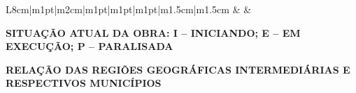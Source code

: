\documentclass{article}
\begin{document}
\begin{longtable}[c]{L{8cm}|m{1pt}|m{2cm}|m{1pt}|m{1pt}|m{1pt}|m{1.5cm}|m{1.5cm}}
\hline \hline 
{} &  &  \\
\end{longtable}
\raggedright{\textbf{SITUAÇÃO ATUAL DA OBRA: I – INICIANDO; E – EM EXECUÇÃO; P – PARALISADA}} 
\newpage
\ifthispageodd{ }{\afterpage{\null\thispagestyle{empty}\newpage}}
\restoregeometry
\vspace*{9cm}
{}
\centering \Huge {\textbf{RELAÇÃO DAS REGIÕES GEOGRÁFICAS INTERMEDIÁRIAS E RESPECTIVOS MUNICÍPIOS}}
\afterpage{\null\thispagestyle{empty}\newpage}
\newpage


\renewcommand*{\arraystretch}{1.5}
\normalsize
\end{document}
